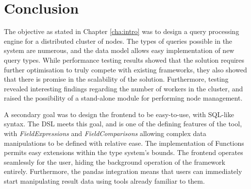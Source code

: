 
\section{Conclusion}
The objective as stated in Chapter \ref{cha:intro} was to design a query processing engine for a distributed cluster of nodes. The types of queries possible in the system are numerous, and the data model allows easy implementation of new query types. While performance testing results showed that the solution requires further optimisation to truly compete with existing frameworks, they also showed that there is promise in the scalability of the solution. Furthermore, testing revealed interesting findings regarding the number of workers in the cluster, and raised the possibility of a stand-alone module for performing node management. 

A secondary goal was to design the frontend to be easy-to-use, with SQL-like syntax. The DSL meets this goal, and is one of the defining features of the tool, with \textit{FieldExpressions} and \textit{FieldComparisons} allowing complex data manipulations to be defined with relative ease. The implementation of Functions permits easy extensions within the type system's bounds. The frontend operates seamlessly for the user, hiding the background operation of the framework entirely. Furthermore, the pandas integration means that users can immediately start manipulating result data using tools already familiar to them.